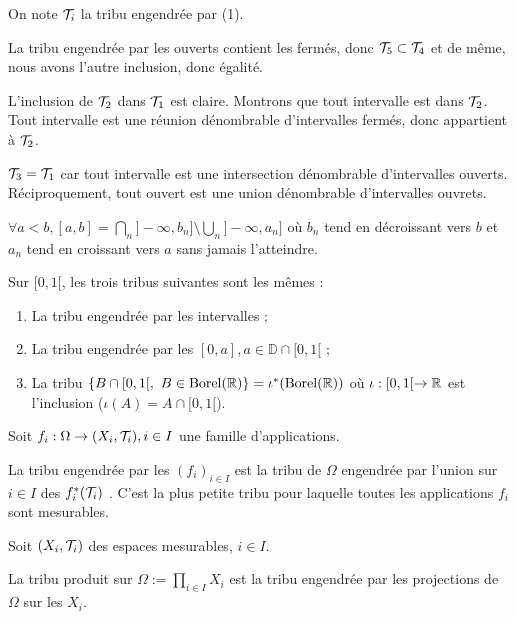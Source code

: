 \documentclass[10pt,a4paper,notitlepage ]{report}
\begin{document}
\begin{demo}

On note $\mathcal T_i $ la tribu engendrée par (1).

La tribu engendrée par les ouverts contient les fermés, donc $\mathcal T_5 \subset \mathcal T_4 $ et de même, nous avons l'autre inclusion, donc égalité. 

L'inclusion de $\mathcal T_2 $ dans $\mathcal T_1$ est claire. Montrons que tout intervalle est dans $\mathcal T_2$. Tout intervalle est une réunion dénombrable d'intervalles fermés, donc appartient à $\mathcal T_2$.

$\mathcal T_3 = \mathcal T_1$ car tout intervalle est une intersection dénombrable d'intervalles ouverts. Réciproquement, tout ouvert est une union dénombrable d'intervalles ouvrets.

$\forall a < b, [a,b] = \bigcap_n ]-\infty, b_n ] \setminus \bigcup_n ]-\infty, a_n ]$ où $b_n$ tend en décroissant vers $b$ et $a_n$ tend en croissant vers $a$ sans jamais l'atteindre. 
\end{demo}

\begin{propriete}
Sur $[0, 1[$, les trois tribus suivantes sont les mêmes : 
\begin{enumerate}
\item La tribu engendrée par les intervalles ;
\item La tribu engendrée par les $[0, a], a \in \mathbb{D} \cap [0,1[ $ ;
\item La tribu $\lbrace B \cap [0,1[,\ B \in \mathrm{Borel}(\mathbb R) \rbrace = \iota^*(\mathrm{Borel}(\mathbb R)) $ où $\iota:[0,1[\rightarrow \mathbb R$ est l'inclusion ($\iota(A) = A\cap [0,1[$).
\end{enumerate}

\end{propriete}

\begin{definition}
Soit $f_i : \Omega \rightarrow (X_i , \mathcal T_i ) , i \in I$ une famille d'applications.

La tribu engendrée par les $(f_i)_{ i \in I }$ est la tribu de $\Omega$ engendrée par l'union sur $i \in I$ des $f_i^*(\mathcal T_i ) $ . C'est la plus petite tribu pour laquelle toutes les applications $f_i$ sont mesurables.
\end{definition}

\begin{definition}

Soit $(X_i , \mathcal T_i )$ des espaces mesurables, $i \in I $.

La tribu produit sur $\Omega := \prod_{i\in I} X_i $ est la tribu engendrée par les projections de $\Omega$ sur les $X_i$.

\end{definition}
\end{document}
